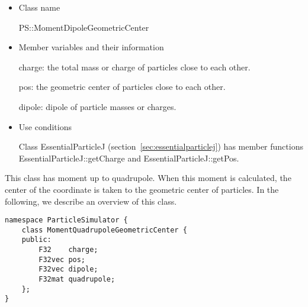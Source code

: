 \begin{itemize}
\item Class name

  PS::MomentDipoleGeometricCenter

\item Member variables and their information

  charge: the total mass or charge of particles close to each other.

  pos: the geometric center of particles close to each other.

  dipole: dipole of particle masses or charges.

\item Use conditions

  Class EssentialParticleJ (section~\ref{sec:essentialparticlej}) has
  member functions EssentialParticleJ::getCharge and
  EssentialParticleJ::getPos.

\end{itemize}


This class has moment up to quadrupole. When this moment is
calculated, the center of the coordinate is taken to the geometric
center of particles. In the following, we describe an overview of this
class.
\begin{screen}
\begin{verbatim}
namespace ParticleSimulator {
    class MomentQuadrupoleGeometricCenter {
    public:
        F32    charge;    
        F32vec pos;
        F32vec dipole;
        F32mat quadrupole;
    };
}
\end{verbatim}
\end{screen}

